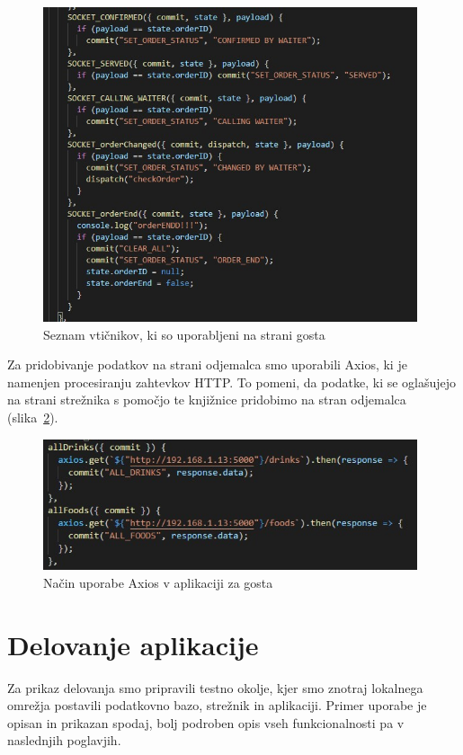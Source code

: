 \documentclass[a4paper, 12pt]{book}
\begin{document}
\begin{figure}[!htb]
\begin{center}
\includegraphics[width=11cm]{socketio_1.jpg}
\caption{Seznam vtičnikov, ki so uporabljeni na strani gosta}
\label{socketioo1}
\end{center}
\end{figure}

Za pridobivanje podatkov na strani odjemalca smo uporabili Axios, ki je namenjen procesiranju zahtevkov  HTTP. To pomeni, da podatke, ki se oglašujejo na strani strežnika s pomočjo te knjižnice pridobimo na stran odjemalca (slika~\ref{axios_1}). 

\begin{figure}[!htb]
\begin{center}
\includegraphics[width=11cm]{axios_1.jpg}
\caption{Način uporabe Axios v aplikaciji za gosta}
\label{axios_1}
\end{center}
\end{figure}


\chapter {Delovanje aplikacije}
Za prikaz delovanja smo pripravili testno okolje, kjer smo znotraj lokalnega omrežja postavili podatkovno bazo, strežnik in aplikaciji. Primer uporabe je opisan in prikazan spodaj, bolj podroben opis vseh funkcionalnosti pa v naslednjih poglavjih.
\end{document}
